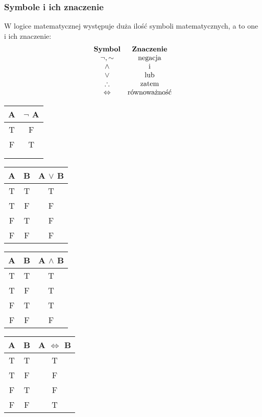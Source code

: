 \documentclass[12pt, a4paper]{article}
\begin{document}
\subsubsection*{Symbole i ich znaczenie}
W logice matematycznej występuje duża ilość symboli matematycznych, a to one i ich znaczenie:
$$
  \begin{array}{c@{\quad}c}
    \textbf{Symbol} & \textbf{Znaczenie} \\
    \neg, \sim & \text{negacja} \\
    \wedge & \text{i} \\
    \vee & \text{lub} \\
    \therefore & \text{zatem} \\
    \Leftrightarrow & \text{równoważność} \\
  \end{array}
$$
\begin{center}
\begin{tabular}{c@{\quad}c}
\textbf{A} & $\neg$ \textbf{A} \\ \hline
T & F \\
F & T \\
\phantom{T} & \phantom{T} \\
\phantom{T} & \phantom{T} \\
\end{tabular}
\quad
\quad
\quad
\quad
\begin{tabular}{c@{\quad}c@{\quad}c}
\textbf{A} & \textbf{B} & \textbf{A} $\vee$ \textbf{B} \\ \hline
T & T & T \\
T & F & F \\
F & T & F \\
F & F & F \\
\end{tabular}
\quad
\quad
\quad
\quad
\begin{tabular}{c@{\quad}c@{\quad}c}
\textbf{A} & \textbf{B} & \textbf{A} $\wedge$ \textbf{B} \\ \hline
T & T & T \\
T & F & T \\
F & T & T \\
F & F & F \\
\end{tabular}
\end{center}
\begin{center}
\begin{tabular}{c@{\quad}c@{\quad}c}
\textbf{A} & \textbf{B} & \textbf{A} $\Leftrightarrow$ \textbf{B} \\ \hline
T & T & T \\
T & F & F \\
F & T & F \\
F & F & T \\
\end{tabular}
\end{center}
\end{document}
